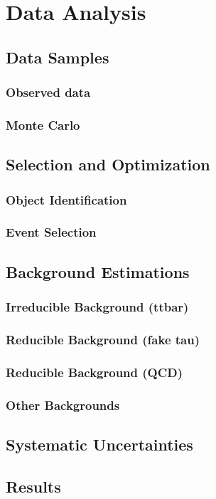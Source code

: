 \chapter{Data Analysis
\label{ch:analysis}}

\section{Data Samples}

\subsection{Observed data}

\subsection{Monte Carlo}

\section{Selection and Optimization}

\subsection{Object Identification}

\subsection{Event Selection}

\section{Background Estimations}

\subsection{Irreducible Background (ttbar)}

\subsection{Reducible Background (fake tau)}

\subsection{Reducible Background (QCD)}

\subsection{Other Backgrounds}

\section{Systematic Uncertainties}

\section{Results}